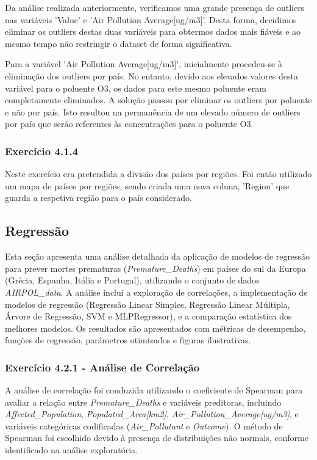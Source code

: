 \documentclass[conference]{IEEEtran}
\begin{document}
Da análise realizada anteriormente, verificamos uma grande presença de outliers nas variáveis 'Value' e 'Air Pollution Average[ug/m3]'.
Desta forma, decidimos eliminar os outliers destas duas variáveis para obtermos dados mais fiáveis e ao mesmo tempo não restringir o dataset de forma significativa. 

Para a variável 'Air Pollution Average[ug/m3]', inicialmente procedeu-se à eliminação dos outliers por país. No entanto, devido aos elevados valores desta variável para o poluente O3, os dados para este mesmo poluente eram completamente eliminados. A solução passou por eliminar os outliers por poluente e não por país. Isto resultou na permanência de um elevado número de outliers por país que serão referentes às concentrações para o poluente O3.

\medskip
\subsubsection{\textbf{Exercício 4.1.4}}

Neste exercício era pretendida a divisão dos países por regiões. Foi então utilizado um mapa de países por regiões, sendo criada uma nova coluna, 'Region' que guarda a respetiva região para o país considerado.

\medskip
\subsection{Regressão}

Esta seção apresenta uma análise detalhada da aplicação de modelos de regressão para prever mortes prematuras (\textit{Premature\_Deaths}) em países do sul da Europa (Grécia, Espanha, Itália e Portugal), utilizando o conjunto de dados \textit{AIRPOL\_data}. A análise inclui a exploração de correlações, a implementação de modelos de regressão (Regressão Linear Simples, Regressão Linear Múltipla, Árvore de Regressão, SVM e MLPRegressor), e a comparação estatística dos melhores modelos. Os resultados são apresentados com métricas de desempenho, funções de regressão, parâmetros otimizados e figuras ilustrativas.

\medskip
\subsubsection{\textbf{Exercício 4.2.1 - Análise de Correlação}}

A análise de correlação foi conduzida utilizando o coeficiente de Spearman para avaliar a relação entre \textit{Premature\_Deaths} e variáveis preditoras, incluindo \textit{Affected\_Population}, \textit{Populated\_Area[km2]}, \textit{Air\_Pollution\_Average[ug/m3]}, e variáveis categóricas codificadas (\textit{Air\_Pollutant} e \textit{Outcome}). O método de Spearman foi escolhido devido à presença de distribuições não normais, conforme identificado na análise exploratória.
\end{document}
